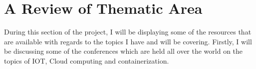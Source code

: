 






\section{A Review of Thematic Area}
During this section of the project, I will be displaying some of the resources that are available with regards to the topics I have and will be covering. Firstly, I will be discussing some of the conferences which are held all over the world on the topics of IOT, Cloud computing and containerization.


